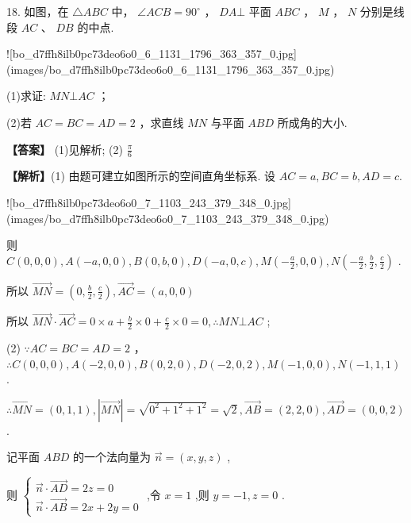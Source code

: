 \documentclass[10pt]{article}
\begin{document}
\newpage

18. 如图，在 \(\bigtriangleup  {ABC}\) 中， \(\angle {ACB} = {90}^{ \circ  }\) ， \({DA}\bot\) 平面 \({ABC}\) ， \(M\) ， \(N\) 分别是线段 \({AC}\) 、 \({DB}\) 的中点.

![bo_d7ffh8ilb0pc73deo6o0_6_1131_1796_363_357_0.jpg](images/bo_d7ffh8ilb0pc73deo6o0_6_1131_1796_363_357_0.jpg)

(1)求证: \({MN}\bot {AC}\) ；

(2)若 \({AC} = {BC} = {AD} = 2\) ，求直线 \({MN}\) 与平面 \({ABD}\) 所成角的大小.

\textbf{【答案】} (1)见解析; (2) \(\frac{\pi }{6}\)

\textbf{【解析】}(1) 由题可建立如图所示的空间直角坐标系. 设 \({AC} = a,{BC} = b,{AD} = c.\)

![bo_d7ffh8ilb0pc73deo6o0_7_1103_243_379_348_0.jpg](images/bo_d7ffh8ilb0pc73deo6o0_7_1103_243_379_348_0.jpg)

则 \(C\left( {0,0,0}\right) , A\left( {-a,0,0}\right) , B\left( {0, b,0}\right) , D\left( {-a,0, c}\right) , M\left( {-\frac{a}{2},0,0}\right) , N\left( {-\frac{a}{2},\frac{b}{2},\frac{c}{2}}\right)\) .

所以 \(\overrightarrow{MN} = \left( {0,\frac{b}{2},\frac{c}{2}}\right) ,\overrightarrow{AC} = \left( {a,0,0}\right)\)

所以 \(\overrightarrow{MN} \cdot  \overrightarrow{AC} = 0 \times  a + \frac{b}{2} \times  0 + \frac{c}{2} \times  0 = 0,\therefore {MN} \bot  {AC}\) ;

(2) \(\because {AC} = {BC} = {AD} = 2\) ， \(\therefore C\left( {0,0,0}\right) , A\left( {-2,0,0}\right) , B\left( {0,2,0}\right) , D\left( {-2,0,2}\right) , M\left( {-1,0,0}\right) , N\left( {-1,1,1}\right)\) .

\(\therefore \overrightarrow{MN} = \left( {0,1,1}\right) ,\left| \overrightarrow{MN}\right|  = \sqrt{{0}^{2} + {1}^{2} + {1}^{2}} = \sqrt{2},\overrightarrow{AB} = \left( {2,2,0}\right) ,\overrightarrow{AD} = \left( {0,0,2}\right)\) .

记平面 \({ABD}\) 的一个法向量为 \(\overrightarrow{n} = \left( {x, y, z}\right)\) ,

则 \(\left\{  \begin{matrix} \overrightarrow{n} \cdot  \overrightarrow{AD} = {2z} = 0 \\  \overrightarrow{n} \cdot  \overrightarrow{AB} = {2x} + {2y} = 0 \end{matrix}\right.\) ,令 \(x = 1\) ,则 \(y =  - 1, z = 0\) .
\end{document}
